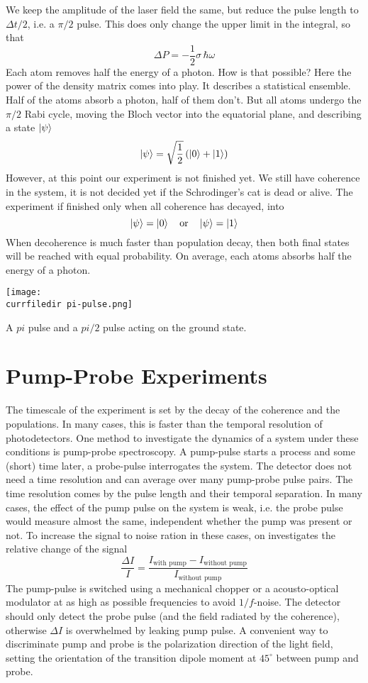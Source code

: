 We keep the amplitude of the laser field the same, but reduce the pulse length to $\Delta t / 2$, i.e. a $\pi/2$ pulse. This does only change the upper limit in the integral, so that 
\[
 \Delta P 
= -  \frac{1}{2} \sigma \,  \hbar \omega  
\]
Each atom removes half the energy  of a photon. How is that possible?  Here the power of the density matrix comes into play. It describes a statistical ensemble. Half of the atoms absorb a photon, half of them don't. But all atoms undergo the $\pi/2$ Rabi cycle, moving the Bloch vector into the equatorial plane, and describing a state $\ket{\psi}$
\[
 \ket{\psi} = \sqrt{\frac{1}{2}} \left( \ket{0} + \ket{1} \right)
\]
However, at this point our experiment is not finished yet. We still have coherence in the system, it is not decided yet if the Schrodinger's cat is dead or alive. The experiment if finished only when all coherence has decayed, into
\[
 \ket{\psi} = \ket{0}  \quad \text{or} \quad \ket{\psi} = \ket{1} 
\]
When decoherence is much faster than population decay, then both final states will be reached with equal probability. On average, each atoms absorbs half the energy of a photon.

\begin{marginfigure}
\texttt{[image: \\currfiledir pi-pulse.png]}
\caption{A $pi$ pulse and a $pi/2$ pulse acting on the ground state.}
\end{marginfigure}

\section{Pump-Probe Experiments}

The timescale of the experiment is set by the decay of the coherence and the populations. In many cases, this is faster than the temporal resolution of photodetectors. One method to investigate the dynamics of a system under these conditions is pump-probe spectroscopy. A pump-pulse starts a process and some (short) time later, a probe-pulse interrogates the system. The detector does not need a time resolution and can average over many pump-probe pulse pairs. The time resolution comes by the pulse length and their temporal separation. In many cases, the effect of the pump pulse on the system is weak, i.e. the probe pulse would measure almost the same, independent whether the pump was present or not. To increase the signal to noise ration in these cases, on investigates the relative change of the signal
\[
 \frac{\Delta I}{I} = \frac{I_\text{with pump} - I_\text{without pump} }{I_\text{without pump}}
\]
The pump-pulse is switched using a mechanical chopper or a acousto-optical modulator at as high as possible frequencies to avoid $1/f$-noise. The detector should only detect the probe pulse (and the field radiated by the coherence), otherwise $\Delta I$ is overwhelmed by leaking pump pulse. A convenient way to discriminate pump and probe is the polarization direction of the light field, setting the orientation of the transition dipole moment at $45^\circ$ between pump and probe.



